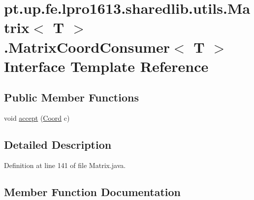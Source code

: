 \hypertarget{interfacept_1_1up_1_1fe_1_1lpro1613_1_1sharedlib_1_1utils_1_1_matrix_1_1_matrix_coord_consumer}{}\section{pt.\+up.\+fe.\+lpro1613.\+sharedlib.\+utils.\+Matrix$<$ T $>$.Matrix\+Coord\+Consumer$<$ T $>$ Interface Template Reference}
\label{interfacept_1_1up_1_1fe_1_1lpro1613_1_1sharedlib_1_1utils_1_1_matrix_1_1_matrix_coord_consumer}
\subsection*{Public Member Functions}
\begin{DoxyCompactItemize}
\item 
void \hyperlink{interfacept_1_1up_1_1fe_1_1lpro1613_1_1sharedlib_1_1utils_1_1_matrix_1_1_matrix_coord_consumer_afb06cc9e104a10f304d657288671d913}{accept} (\hyperlink{classpt_1_1up_1_1fe_1_1lpro1613_1_1sharedlib_1_1utils_1_1_coord}{Coord} c)
\end{DoxyCompactItemize}


\subsection{Detailed Description}


Definition at line 141 of file Matrix.\+java.



\subsection{Member Function Documentation}
\hypertarget{interfacept_1_1up_1_1fe_1_1lpro1613_1_1sharedlib_1_1utils_1_1_matrix_1_1_matrix_coord_consumer_afb06cc9e104a10f304d657288671d913}{}\label{interfacept_1_1up_1_1fe_1_1lpro1613_1_1sharedlib_1_1utils_1_1_matrix_1_1_matrix_coord_consumer_afb06cc9e104a10f304d657288671d913} 
